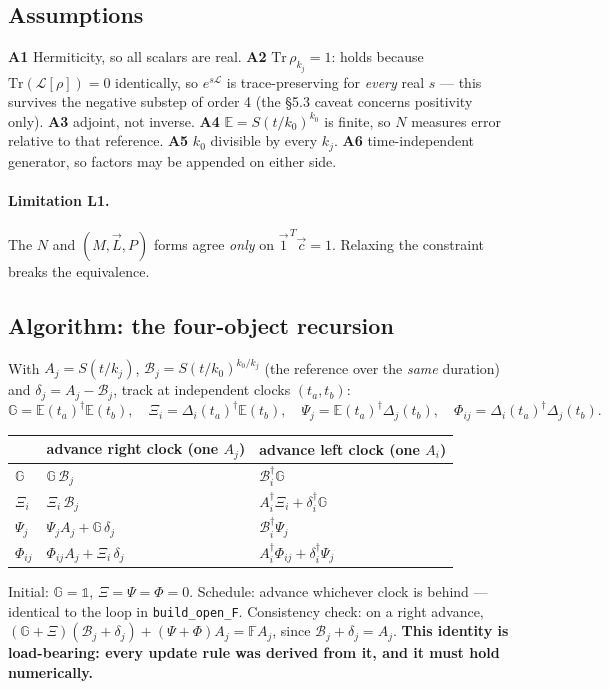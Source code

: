 \documentclass[11pt,a4paper]{article}
\newcommand{\FF}{\mathbb{F}}\newcommand{\GG}{\mathbb{G}}\newcommand{\EE}{\mathbb{E}}
\begin{document}
\subsection{Assumptions}
\textbf{A1} Hermiticity, so all scalars are real. \textbf{A2} $\mathrm{Tr}\,\rho_{k_j}=1$: holds
because $\mathrm{Tr}(\mathcal{L}[\rho])=0$ identically, so $e^{s\mathcal{L}}$ is trace-preserving
for \emph{every} real $s$ --- this survives the negative substep of order 4 (the \S5.3 caveat
concerns positivity only). \textbf{A3} adjoint, not inverse. \textbf{A4} $\EE=S(t/k_0)^{k_0}$ is
finite, so $N$ measures error relative to that reference. \textbf{A5} $k_0$ divisible by every
$k_j$. \textbf{A6} time-independent generator, so factors may be appended on either side.

\paragraph{Limitation L1.} The $N$ and $(M,\vec L,P)$ forms agree \emph{only} on
$\vec1^{\,T}\vec c=1$. Relaxing the constraint breaks the equivalence.

\subsection{Algorithm: the four-object recursion}
With $A_j=S(t/k_j)$, $\mathcal{B}_j=S(t/k_0)^{k_0/k_j}$ (the reference over the \emph{same}
duration) and $\delta_j=A_j-\mathcal{B}_j$, track at independent clocks $(t_a,t_b)$:
\[
\GG=\EE(t_a)^\dagger\EE(t_b),\quad \Xi_i=\Delta_i(t_a)^\dagger\EE(t_b),\quad
\Psi_j=\EE(t_a)^\dagger\Delta_j(t_b),\quad \Phi_{ij}=\Delta_i(t_a)^\dagger\Delta_j(t_b).
\]
\begin{center}\small
\begin{tabular}{@{}lll@{}}
\toprule
& advance right clock (one $A_j$) & advance left clock (one $A_i$)\\
\midrule
$\GG$ & $\GG\,\mathcal{B}_j$ & $\mathcal{B}_i^\dagger\GG$\\
$\Xi_i$ & $\Xi_i\,\mathcal{B}_j$ & $A_i^\dagger\Xi_i+\delta_i^\dagger\GG$\\
$\Psi_j$ & $\Psi_jA_j+\GG\,\delta_j$ & $\mathcal{B}_i^\dagger\Psi_j$\\
$\Phi_{ij}$ & $\Phi_{ij}A_j+\Xi_i\,\delta_j$ & $A_i^\dagger\Phi_{ij}+\delta_i^\dagger\Psi_j$\\
\bottomrule
\end{tabular}
\end{center}
Initial: $\GG=\mathbb{1}$, $\Xi=\Psi=\Phi=0$. Schedule: advance whichever clock is behind ---
identical to the loop in \texttt{build\_open\_F}. Consistency check: on a right advance,
$(\GG{+}\Xi)(\mathcal{B}_j{+}\delta_j)+(\Psi{+}\Phi)A_j=\FF A_j$, since
$\mathcal{B}_j+\delta_j=A_j$. \textbf{This identity is load-bearing: every update rule was
derived from it, and it must hold numerically.}
\end{document}
